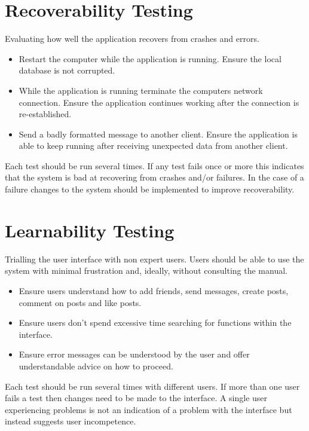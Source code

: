\section{Recoverability Testing}
Evaluating how well the application recovers from crashes and errors.
\begin{itemize}
\item Restart the computer while the application is running.
Ensure the local database is not corrupted.
\item While the application is running terminate the computers network 
connection. Ensure the application continues working after the connection is
re-established.
\item Send a badly formatted message to another client. Ensure the application 
is able to keep running after receiving unexpected data from another client.
\end{itemize}
Each test should be run several times. If any test fails once or more this 
indicates that the system is bad at recovering from crashes and/or failures.
In the case of a failure changes to the system should be implemented to improve
recoverability.

\section{Learnability Testing}
Trialling the user interface with non expert users. Users should be able to use
the system with minimal frustration and, ideally, without consulting the manual.
\begin{itemize}
\item Ensure users understand how to add friends, send messages, create posts, 
comment on posts and like posts.
\item Ensure users don't spend excessive time searching for functions within the
interface.
\item Ensure error messages can be understood by the user and offer 
understandable advice on how to proceed.
\end{itemize}
Each test should be run several times with different users. If more than one 
user fails a test then changes need to be made to the interface. A single user 
experiencing problems is not an indication of a problem with the interface but 
instead suggests user incompetence.

